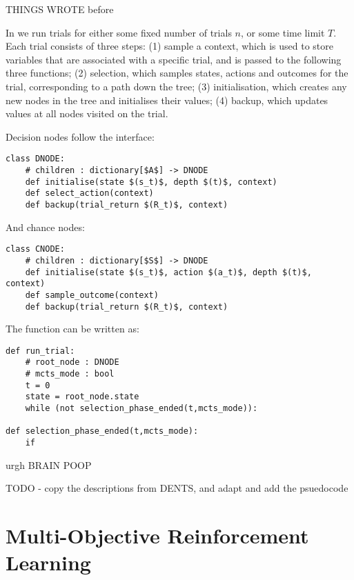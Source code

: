 \clearpage
THINGS WROTE before
\clearpage







        
        In \thtspp\ewe we run trials for either some fixed number of trials $n$, or some time limit $T$. Each trial 
        consists of three steps: 
        (1) sample a context, which is used to store variables that are associated with a specific trial, and is passed to the following three functions;
        (2) selection, which samples states, actions and outcomes for the trial, corresponding to a path down the tree;
        (3) initialisation, which creates any new nodes in the tree and initialises their values;
        (4) backup, which updates values at all nodes visited on the trial.

        Decision nodes follow the interface:
        \begin{lstlisting}
class DNODE:
    # children : dictionary[$A$] -> DNODE
    def initialise(state $(s_t)$, depth $(t)$, context)
    def select_action(context)
    def backup(trial_return $(R_t)$, context)
        \end{lstlisting}

        And chance nodes:
        \begin{lstlisting}
class CNODE:
    # children : dictionary[$S$] -> DNODE
    def initialise(state $(s_t)$, action $(a_t)$, depth $(t)$, context)
    def sample_outcome(context)
    def backup(trial_return $(R_t)$, context)
        \end{lstlisting}

        The \runtrial function can be written as:
        \begin{lstlisting}
def run_trial:
    # root_node : DNODE
    # mcts_mode : bool
    t = 0
    state = root_node.state
    while (not selection_phase_ended(t,mcts_mode)):

def selection_phase_ended(t,mcts_mode):
    if 
        \end{lstlisting}


        urgh BRAIN POOP

        TODO - copy the descriptions from DENTS, and adapt and add the psuedocode






\section{Multi-Objective Reinforcement Learning}
\label{sec:2-3-morl}
    

